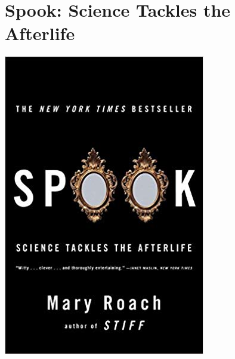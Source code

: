\documentclass{tufte-handout}
\makeatletter
\newcommand{\varcaption}[2][0pt]{%
  \gsetlength{\@tufte@caption@vertical@offset}{-#1}%
  \gdef\@tufte@stored@varcaption{#2}%
}
\gdef\@tufte@stored@varcaption{} %
\makeatother
\begin{document}
\section*{Spook: Science Tackles the Afterlife}
\begin{marginfigure}[3\baselineskip]
   \includegraphics[width=\linewidth]{images/spook.jpg}
   \varcaption{\href{https://wwnorton.com/books/9780393329124}{Publisher Link}, \href{https://www.amazon.com/Spook-Science-Afterlife-Mary-Roach/dp/0393329127/}{Amazon Link}}
\end{marginfigure}
\end{document}
